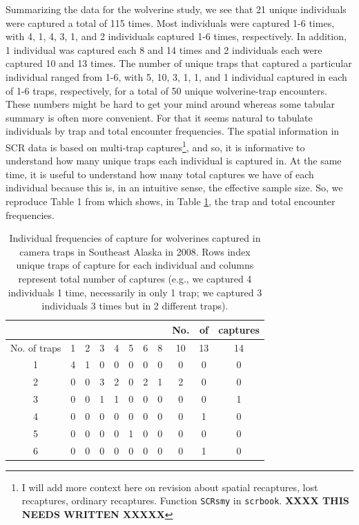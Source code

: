 Summarizing the data for the wolverine study, we see that 21
unique individuals were captured a total of 115 times. Most
individuals were captured 1-6 times, with 4, 1, 4, 3, 1, and 2
individuals captured 1-6 times, respectively.  In addition, 1
individual was captured each 8 and 14 times and 2 individuals each
were captured 10 and 13 times.  The number of unique traps that
captured a particular individual ranged from 1-6, with 5, 10, 3, 1, 1,
and 1 individual captured in each of 1-6 traps, respectively, for a
total of 50 unique wolverine-trap encounters.  These numbers might be
hard to get your mind around whereas some tabular summary is often
more convenient. For that it seems natural to tabulate individuals by
trap and total encounter frequencies. The spatial information in SCR
data is based on multi-trap captures\footnote{I will add more context
  here on revision about spatial recaptures, lost recaptures, ordinary
  recaptures. Function \mbox{\tt SCRsmy} in \mbox{\tt scrbook}. {\bf
    XXXX THIS NEEDS WRITTEN XXXXX}  }, and
so, it is informative to understand how many unique traps each
individual is captured in. At the same time, it is useful to
understand how many total captures we have of each individual because
this is, in an intuitive sense, the effective sample size.  So, we
reproduce Table 1 from \citet{royle_etal:2011jwm} which shows,
in Table \ref{scr0.tab.wolverine}, the trap
and total encounter frequencies.



\begin{table} [htp]
  \caption{Individual frequencies of capture for wolverines captured
    in camera traps in Southeast Alaska in 2008. Rows index unique
    traps of capture for each individual
and columns represent total number of captures
    (e.g., we captured 4 individuals 1 time, necessarily in only 1
    trap; we captured 3 individuals 3 times but in 2 different traps).
}
\centering
\begin{tabular}{c c c c c c c c c c c}
\hline
 & & & & & & & &  No.&of&captures \\
\hline
No. of traps & 1 & 2 & 3 & 4 & 5 & 6 & 8 & 10 &13 &14 \\
\hline
1 & 4 & 1 & 0 & 0 & 0 & 0 & 0 & 0 & 0 & 0 \\
2 & 0 & 0 & 3 & 2 & 0 & 2 & 1 & 2 & 0 & 0 \\
3 & 0 & 0 & 1 & 1 & 0 & 0 & 0 & 0 & 0 & 1 \\
4 & 0 & 0 & 0 & 0 & 0 & 0 & 0 & 0 & 1 & 0 \\
5 & 0 & 0 & 0 & 0 & 1 & 0 & 0 & 0 & 0 & 0 \\
6 & 0 & 0 & 0 & 0 & 0 & 0 & 0 & 0 & 1 & 0 \\
\hline
\end{tabular}
\label{scr0.tab.wolverine}
\end{table}


